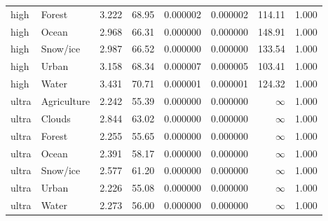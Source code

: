 \begin{table}[t]
\begin{tabular}{@{}llrrrrrr@{}}
high   & Forest      & 3.222  & 68.95 & 0.000002 & 0.000002 & 114.11   & 1.000 \\
high   & Ocean       & 2.968  & 66.31 & 0.000000 & 0.000000 & 148.91   & 1.000 \\
high   & Snow/ice    & 2.987  & 66.52 & 0.000000 & 0.000000 & 133.54   & 1.000 \\
high   & Urban       & 3.158  & 68.34 & 0.000007 & 0.000005 & 103.41   & 1.000 \\
high   & Water       & 3.431  & 70.71 & 0.000001 & 0.000001 & 124.32   & 1.000 \\
\addlinespace
ultra  & Agriculture & 2.242  & 55.39 & 0.000000 & 0.000000 & $\infty$ & 1.000 \\
ultra  & Clouds      & 2.844  & 63.02 & 0.000000 & 0.000000 & $\infty$ & 1.000 \\
ultra  & Forest      & 2.255  & 55.65 & 0.000000 & 0.000000 & $\infty$ & 1.000 \\
ultra  & Ocean       & 2.391  & 58.17 & 0.000000 & 0.000000 & $\infty$ & 1.000 \\
ultra  & Snow/ice    & 2.577  & 61.20 & 0.000000 & 0.000000 & $\infty$ & 1.000 \\
ultra  & Urban       & 2.226  & 55.08 & 0.000000 & 0.000000 & $\infty$ & 1.000 \\
ultra  & Water       & 2.273  & 56.00 & 0.000000 & 0.000000 & $\infty$ & 1.000 \\
\bottomrule
\end{tabular}
\end{table}
